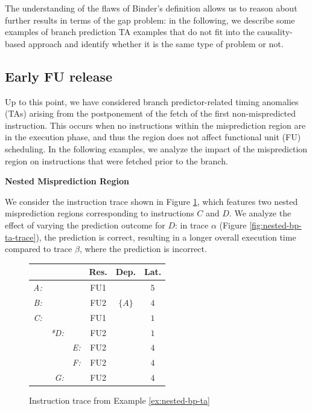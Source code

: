 The understanding of the flaws of Binder's definition \cite{binder_definitions_2022} allows us to reason about further results in terms of the gap problem: in the following, we describe some examples of branch prediction TA examples that do not fit into the causality-based approach and identify whether it is the same type of problem or not.




\subsection{Early FU release}

Up to this point, we have considered branch predictor-related timing anomalies (TAs) arising from the postponement of the fetch of the first non-mispredicted instruction. This occurs when no instructions within the misprediction region are in the execution phase, and thus the region does not affect functional unit (FU) scheduling. In the following examples, we analyze the impact of the misprediction region on instructions that were fetched prior to the branch.

\begin{example}
\textbf{Nested Misprediction Region}

We consider the instruction trace shown in Figure \ref{fig:nested-bp-ta-input}, which features two nested misprediction regions corresponding to instructions $C$ and $D$. We analyze the effect of varying the prediction outcome for $D$: in trace $\alpha$ (Figure \ref{fig:nested-bp-ta-trace}), the prediction is correct, resulting in a longer overall execution time compared to trace $\beta$, where the prediction is incorrect.
    
\label{ex:nested-bp-ta}
\end{example}

\begin{figure}[H]
    \centering
    \begin{tabular}{rrr|ccc}
    &  &  & Res. & Dep. & Lat. \\ \hline
    \textit{A:} &  &  & FU1 &  & $5$ \\
    \textit{B:} &  &  & FU2 & $\{A\}$ & $4$ \\
    \textit{C:} &  &  & FU1 &  & $1$ \\
    & \textit{*D:} &  & FU2 &  & $1$ \\
    &  & \textit{E:} & FU2 &  & $4$ \\
    &  & \textit{F:} & FU2 &  & $4$ \\
    & \textit{G:} &  & FU2 &  & $4$ \\
    \end{tabular}
    \caption{Instruction trace from Example \ref{ex:nested-bp-ta}}
    \label{fig:nested-bp-ta-input}
\end{figure}




